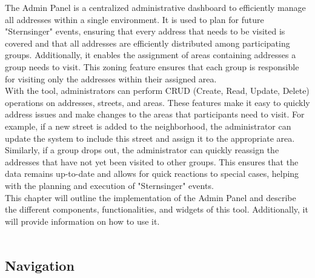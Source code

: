 \Author{\daAuthorOne}

The Admin Panel is a centralized administrative dashboard to efficiently manage all addresses within a single environment. It is used to plan for future "Sternsinger" events, ensuring that every address that needs to be visited is covered and that all addresses are efficiently distributed among participating groups. Additionally, it enables the assignment of areas containing addresses a group needs to visit. This zoning feature ensures that each group is responsible for visiting only the addresses within their assigned area.\\

With the tool, administrators can perform CRUD (Create, Read, Update, Delete) operations on addresses, streets, and areas. These features make it easy to quickly address issues and make changes to the areas that participants need to visit. For example, if a new street is added to the neighborhood, the administrator can update the system to include this street and assign it to the appropriate area. Similarly, if a group drops out, the administrator can quickly reassign the addresses that have not yet been visited to other groups. This ensures that the data remains up-to-date and allows for quick reactions to special cases, helping with the planning and execution of "Sternsinger" events.\\

This chapter will outline the implementation of the Admin Panel and describe the different components, functionalities, and widgets of this tool. Additionally, it will provide information on how to use it.\\\\

\subsection{Navigation}

